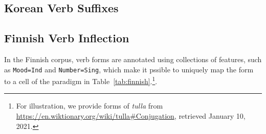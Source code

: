 \documentclass[11pt,letterpaper]{article}
\begin{document}

\subsection{Korean Verb Suffixes}



\subsection{Finnish Verb Inflection}

In the Finnish corpus, verb forms are annotated using collections of features, such as \texttt{Mood=Ind} and \texttt{Number=Sing}, which make it pssible to uniquely map the form to a cell of the paradigm in Table~\ref{tab:finnish}.\footnote{For illustration, we provide forms of \textit{tulla} from \url{https://en.wiktionary.org/wiki/tulla\#Conjugation}, retrieved January 10, 2021.}.
\end{document}
